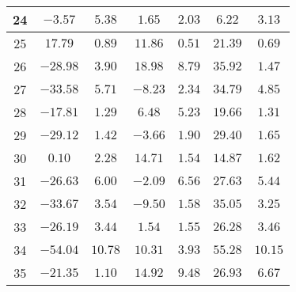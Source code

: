 \begin{table}[H]
\begin{tabular}{|c|c|c|c|c|c|c|}
                        24  &    $-3.57$   &  $5.38$  & $1.65$   &  $2.03$  & $6.22$   &  $3.13$  \\ \hline
                        25  &    $17.79$   &  $0.89$  & $11.86$  &  $0.51$  & $21.39$  &  $0.69$  \\ \hline
                        26  &    $-28.98$  &  $3.90$  & $18.98$  &  $8.79$  & $35.92$  &  $1.47$  \\ \hline
                        27  &    $-33.58$  &  $5.71$  & $-8.23$  &  $2.34$  & $34.79$  &  $4.85$  \\ \hline
                        28  &    $-17.81$  &  $1.29$  & $6.48$   &  $5.23$  & $19.66$  &  $1.31$  \\ \hline
                        29  &    $-29.12$  &  $1.42$  & $-3.66$  &  $1.90$  & $29.40$  &  $1.65$  \\ \hline
                        30  &    $0.10$    &  $2.28$  & $14.71$  &  $1.54$  & $14.87$  &  $1.62$  \\ \hline
                        31  &    $-26.63$  &  $6.00$  & $-2.09$  &  $6.56$  & $27.63$  &  $5.44$  \\ \hline
                        32  &    $-33.67$  &  $3.54$  & $-9.50$  &  $1.58$  & $35.05$  &  $3.25$  \\ \hline
                        33  &    $-26.19$  &  $3.44$  & $1.54$   &  $1.55$  & $26.28$  &  $3.46$  \\ \hline
                        34  &    $-54.04$  &  $10.78$ & $10.31$  &  $3.93$  & $55.28$  &  $10.15$  \\ \hline
                        35  &    $-21.35$  &  $1.10$  & $14.92$  &  $9.48$  & $26.93$  &  $6.67$  \\ \hline
        \end{tabular}
    \label{tab:media_lab_4_vertical}    
\end{table}

